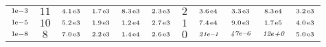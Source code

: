 \begin{tiny}
\begin{tabular}{@{$\;$}c@{$\;$}|@{$\;$}c@{$\;$}@{$\;$}c@{$\;$}@{$\;$}c@{$\;$}@{$\;$}c@{$\;$}@{$\;$}c@{$\;$}|@{$\;$}c@{$\;$}@{$\;$}c@{$\;$}@{$\;$}c@{$\;$}@{$\;$}c@{$\;$}@{$\;$}c@{$\;$}}
$\scriptstyle1\!\mathrm{\hspace{0.10em}e}-3$ & $\scriptstyle11$ & $\scriptstyle4.1\mathrm{\hspace{0.10em}e}3$ & $\scriptstyle1.7\mathrm{\hspace{0.10em}e}3$ & $\scriptstyle8.3\mathrm{\hspace{0.10em}e}3$ & $\scriptstyle2.3\mathrm{\hspace{0.10em}e}3$ & $\scriptstyle2$ & $\scriptstyle3.6\mathrm{\hspace{0.10em}e}4$ & $\scriptstyle3.3\mathrm{\hspace{0.10em}e}3$ & $\scriptstyle8.3\mathrm{\hspace{0.10em}e}4$ & $\scriptstyle3.2\mathrm{\hspace{0.10em}e}3$\\ 
$\scriptstyle1\!\mathrm{\hspace{0.10em}e}-5$ & $\scriptstyle10$ & $\scriptstyle5.2\mathrm{\hspace{0.10em}e}3$ & $\scriptstyle1.9\mathrm{\hspace{0.10em}e}3$ & $\scriptstyle1.2\mathrm{\hspace{0.10em}e}4$ & $\scriptstyle2.7\mathrm{\hspace{0.10em}e}3$ & $\scriptstyle1$ & $\scriptstyle7.4\mathrm{\hspace{0.10em}e}4$ & $\scriptstyle9.0\mathrm{\hspace{0.10em}e}3$ & $\scriptstyle1.7\mathrm{\hspace{0.10em}e}5$ & $\scriptstyle4.0\mathrm{\hspace{0.10em}e}3$\\ 
$\scriptstyle1\!\mathrm{\hspace{0.10em}e}-8$ & $\scriptstyle8$ & $\scriptstyle7.0\mathrm{\hspace{0.10em}e}3$ & $\scriptstyle2.2\mathrm{\hspace{0.10em}e}3$ & $\scriptstyle1.4\mathrm{\hspace{0.10em}e}4$ & $\scriptstyle2.6\mathrm{\hspace{0.10em}e}3$ & $\scriptstyle0$ & $\scriptstyle\textit{21}\hspace{0.00em}e\textit{--1}$ & $\scriptstyle\textit{47}\hspace{0.00em}e\textit{--6}$ & $\scriptstyle\textit{12}\hspace{0.00em}e\textit{+0}$ & $\scriptstyle5.0\mathrm{\hspace{0.10em}e}3$\\ 
\end{tabular} 
\end{tiny} 
